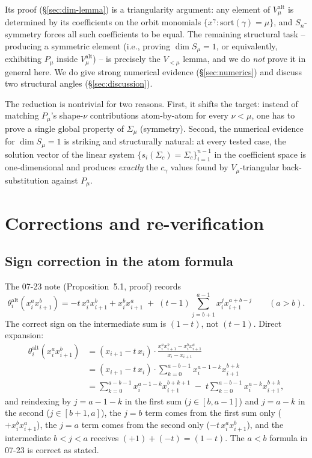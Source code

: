 \documentclass[11pt]{article}
\theoremstyle{definition}
\newcommand{\alt}{\mathrm{alt}}
\newcommand{\sort}{\mathrm{sort}}
\newcommand{\Sig}{\Sigma_\mu}
\begin{document}
Its proof (\S\ref{sec:dim-lemma}) is a triangularity argument: any
element of $V_\mu^\alt$ is determined by its coefficients on the orbit
monomials $\{x^\gamma : \sort(\gamma)=\mu\}$, and $S_n$-symmetry forces
all such coefficients to be equal.  The remaining structural task --
producing a symmetric element (i.e., proving $\dim S_\mu = 1$, or
equivalently, exhibiting $P_\mu$ inside $V_\mu^\alt$) -- is precisely
the $V_{<\mu}$ lemma, and we do \emph{not} prove it in general here.
We do give strong numerical evidence (\S\ref{sec:numerics}) and
discuss two structural angles (\S\ref{sec:discussion}).

\smallskip

The reduction is nontrivial for two reasons.  First, it shifts the
target: instead of matching $P_\mu$'s shape-$\nu$ contributions atom-by-atom
for every $\nu<\mu$, one has to prove a single global property of $\Sig$
(symmetry).  Second, the numerical evidence for $\dim S_\mu = 1$ is
striking and structurally natural: at every tested case, the solution
vector of the linear system $\{s_i(\Sigma_c) = \Sigma_c\}_{i=1}^{n-1}$
in the coefficient space is one-dimensional and produces \emph{exactly}
the $c_\gamma$ values found by $V_\mu$-triangular back-substitution
against $P_\mu$.

\section{Corrections and re-verification}\label{sec:corrections}

\subsection{Sign correction in the atom formula}

The 07-23 note (Proposition~5.1, proof) records
\[
\theta^\alt_i(x_i^a x_{i+1}^b)
  = -t\, x_i^a x_{i+1}^b + x_i^b x_{i+1}^a
  \;+\; (t-1)\!\!\!\sum_{j=b+1}^{a-1}\!\! x_i^j x_{i+1}^{a+b-j}
  \qquad (a > b).
\]
The correct sign on the intermediate sum is $(1-t)$, not $(t-1)$.
Direct expansion:
\begin{align*}
\theta^\alt_i(x_i^a x_{i+1}^b)
 &= (x_{i+1} - t\,x_i)\cdot \tfrac{x_i^a x_{i+1}^b - x_i^b x_{i+1}^a}{x_i - x_{i+1}} \\
 &= (x_{i+1} - t\,x_i)\cdot \sum_{k=0}^{a-b-1} x_i^{a-1-k} x_{i+1}^{b+k} \\
 &= \sum_{k=0}^{a-b-1} x_i^{a-1-k}x_{i+1}^{b+k+1} \;-\; t\sum_{k=0}^{a-b-1}x_i^{a-k} x_{i+1}^{b+k},
\end{align*}
and reindexing by $j=a-1-k$ in the first sum ($j\in[b,a-1]$) and
$j=a-k$ in the second ($j\in[b+1,a]$), the $j=b$ term comes from the
first sum only ($+ x_i^b x_{i+1}^a$), the $j=a$ term comes from the
second only ($-t\, x_i^a x_{i+1}^b$), and the intermediate $b<j<a$
receives $(+1) + (-t) = (1-t)$.  The $a<b$ formula in 07-23 is correct
as stated.
\end{document}
